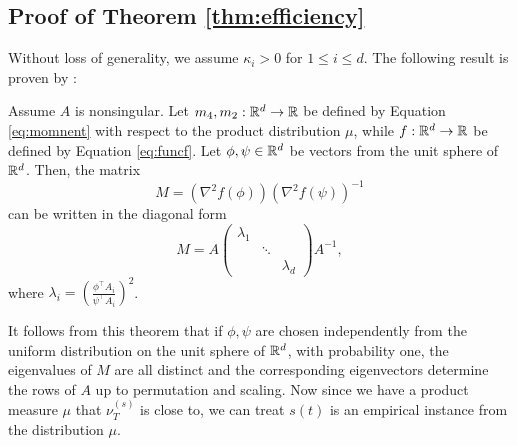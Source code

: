 \subsection{Proof of Theorem \ref{thm:efficiency}}
\label{subsec:ProofEfficiency}
Without loss of generality, we assume $\kappa_i>0$ for $1\le i \le d$. The following result is proven by \citet{DHsu2012}:
\begin{thm}
Assume $A$ is nonsingular. 
Let $m_4,m_2:\mathbb{R}^d \rightarrow \mathbb{R}$ be defined by Equation \eqref{eq:momnent} with respect to the product distribution $\mu$,
	while $f: \mathbb{R}^d \rightarrow \mathbb{R}$ be defined by Equation \eqref{eq:funcf}.
Let $\phi,\psi\in \mathbb{R}^d$ be vectors from the unit sphere of $\mathbb{R}^d$. Then, 
	the matrix
\begin{equation}
\label{eq:M}
M =(\nabla^2f(\phi))(\nabla^2f(\psi))^{-1} 
\end{equation}
can be written in the diagonal form
\begin{equation}
\label{eq:M2}
M = A 
\left(
\begin{array}{ccc}
\lambda_1 & & \\ %
    & \ddots & \\
    & & \lambda_d %
\end{array} 
\right) 
A^{-1},
\end{equation}
where $\lambda_i = \left(\frac{\phi^{\top}A_i}{\psi^{\top}A_i}\right)^2$.
\end{thm}

It follows from this theorem that 
if $\phi,\psi$ are chosen independently from the uniform distribution on the unit sphere of $\mathbb{R}^d$, with probability one,
the eigenvalues of  $M$ are all distinct and the corresponding eigenvectors
determine the rows of $A$ up to permutation and scaling.
Now since we have a product measure $\mu$ that $\nu_T^{(s)}$ is close to, we can treat $s(t)$ is an empirical instance from the distribution $\mu$.  

